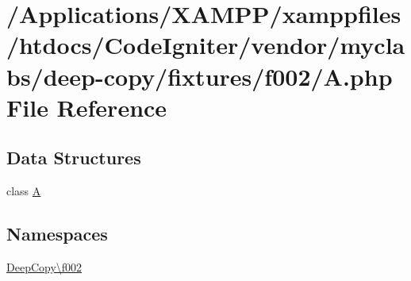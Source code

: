 \hypertarget{f002_2_a_8php}{}\section{/\+Applications/\+X\+A\+M\+P\+P/xamppfiles/htdocs/\+Code\+Igniter/vendor/myclabs/deep-\/copy/fixtures/f002/A.php File Reference}
\label{f002_2_a_8php}
\subsection*{Data Structures}
\begin{DoxyCompactItemize}
\item 
class \mbox{\hyperlink{class_deep_copy_1_1f002_1_1_a}{A}}
\end{DoxyCompactItemize}
\subsection*{Namespaces}
\begin{DoxyCompactItemize}
\item 
 \mbox{\hyperlink{namespace_deep_copy_1_1f002}{Deep\+Copy\textbackslash{}f002}}
\end{DoxyCompactItemize}
